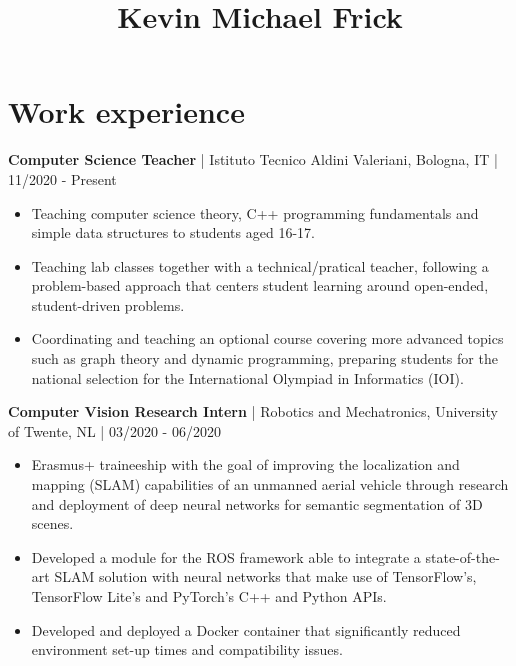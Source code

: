 \documentclass[10pt, a4paper]{article}
\title{Kevin Michael Frick}
\author{}
\begin{document}
  
\maketitle

\vspace{-0.8em}
\hrulefill
\vspace{0.8em}


\section*{Work experience}
\textbf{Computer Science Teacher} | Istituto Tecnico Aldini Valeriani, Bologna, IT | 11/2020 - Present
\begin{itemize}
\item Teaching computer science theory, C++ programming fundamentals and simple data structures to students aged 16-17.
\item Teaching lab classes together with a technical/pratical teacher, following a problem-based approach that centers student learning around open-ended, student-driven problems.
\item Coordinating and teaching an optional course covering more advanced topics such as graph theory and dynamic programming, preparing students for the national selection for the International Olympiad in Informatics (IOI).
\end{itemize}
\textbf{Computer Vision Research Intern} | Robotics and Mechatronics, University of Twente, NL | 03/2020 - 06/2020
\begin{itemize}
\item Erasmus+ traineeship with the goal of improving the localization and mapping (SLAM) capabilities of an unmanned aerial vehicle through research and deployment of deep neural networks for semantic segmentation of 3D scenes.
\item Developed a module for the ROS framework able to integrate a state-of-the-art SLAM solution with neural networks that make use of TensorFlow's, TensorFlow Lite's and PyTorch's C++ and Python APIs.
\item Developed and deployed a Docker container that significantly reduced environment set-up times and compatibility issues.
\end{itemize}
\end{document}
